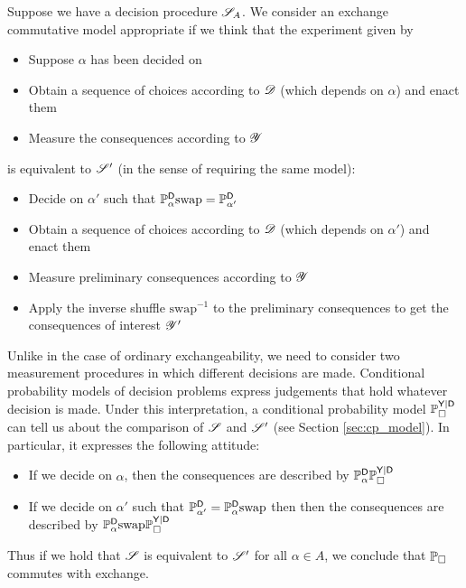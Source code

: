 Suppose we have a decision procedure $\mathscr{S}_A$. We consider an exchange commutative model appropriate if we think that the experiment given by
\begin{itemize}
    \item Suppose $\alpha$ has been decided on
    \item Obtain a sequence of choices according to $\mathscr{D}$ (which depends on $\alpha$) and enact them
    \item Measure the consequences according to $\mathscr{Y}$
\end{itemize}
is equivalent to $\mathscr{S}'$ (in the sense of requiring the same model):
\begin{itemize}
    \item Decide on $\alpha'$ such that $\mathbb{P}_\alpha^{\mathsf{D}}\text{swap}=\mathbb{P}_{\alpha'}^{\mathsf{D}}$
    \item Obtain a sequence of choices according to $\mathscr{D}$ (which depends on $\alpha'$) and enact them
    \item Measure preliminary consequences according to $\mathscr{Y}$
    \item Apply the inverse shuffle $\text{swap}^{-1}$ to the preliminary consequences to get the consequences of interest $\mathscr{Y}'$
\end{itemize}

Unlike in the case of ordinary exchangeability, we need to consider two measurement procedures in which different decisions are made. Conditional probability models of decision problems express judgements that hold whatever decision is made. Under this interpretation, a conditional probability model $\mathbb{P}_\square^{\mathsf{Y}|\mathsf{D}}$ can tell us about the comparison of $\mathscr{S}$ and $\mathscr{S}'$ (see Section \ref{sec:cp_model}). In particular, it expresses the following attitude:

\begin{itemize}
    \item If we decide on $\alpha$, then the consequences are described by $\mathbb{P}_\alpha^{\mathsf{D}} \mathbb{P}_\square^{\mathsf{Y}|\mathsf{D}}$
    \item If we decide on $\alpha'$ such that $\mathbb{P}_{\alpha'}^{\mathsf{D}}=\mathbb{P}_\alpha^{\mathsf{D}}\text{swap}$ then then the consequences are described by $\mathbb{P}_\alpha^{\mathsf{D}}\text{swap}\mathbb{P}_\square^{\mathsf{Y}|\mathsf{D}}$
\end{itemize}

Thus if we hold that $\mathscr{S}$ is equivalent to $\mathscr{S}'$ for all $\alpha\in A$, we conclude that $\mathbb{P}_\square$ commutes with exchange.


